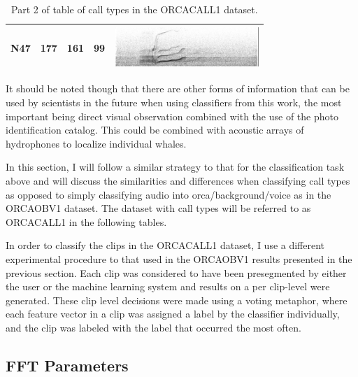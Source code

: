 \documentclass[12pt,oneside]{book}
\begin{document}
\begin{table}
\begin{tabular}{|l|l|l|l|l|}
 N47     &   177      &            161  &   99                    &  \includegraphics[height=1.5cm] {figures/catalog/A12-N47-080210-D056-15012.png} \\ \hline
\end{tabular}
\caption{Part 2 of table of call types in the ORCACALL1 dataset.}
\label{table:calls-table}
\end{table}

It should be noted though that there are other forms of information
that can be used by scientists in the future when using classifiers
from this work, the most important being direct visual observation
combined with the use of the photo identification catalog.  This could
be combined with acoustic arrays of hydrophones to localize individual
whales.

In this section, I will follow a similar strategy to that for the
classification task above and will discuss the similarities and
differences when classifying call types as opposed to simply classifying
audio into orca/background/voice as in the ORCAOBV1 dataset.  The
dataset with call types will be referred to as ORCACALL1 in the following
tables.

In order to classify the clips in the ORCACALL1 dataset, I use a
different experimental procedure to that used in the ORCAOBV1 results
presented in the previous section.  Each clip was considered to have
been presegmented by either the user or the machine learning system
and results on a per clip-level were generated.  These clip level
decisions were made using a voting metaphor, where each feature vector
in a clip was assigned a label by the classifier individually, and the
clip was labeled with the label that occurred the most often.

%
%
\subsection{FFT Parameters}
\end{document}
